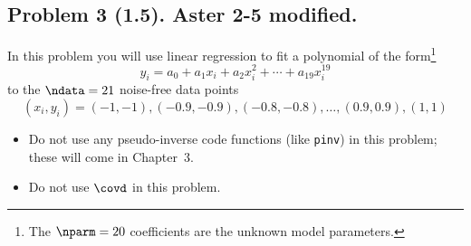 \documentclass[11pt,titlepage,fleqn]{article}
\begin{document}

\subsection*{Problem 3 (1.5). Aster 2-5 modified.}

In this problem you will use linear regression to fit a polynomial of the form\footnote{The $\nparm = 20$ coefficients are the unknown model parameters.}
%
\begin{equation}
y_i = a_0 + a_1x_i + a_2x_i^2 + \cdots + a_{19}x_i^{19}
\label{yi}
\end{equation}
%
to the $\ndata=21$ noise-free data points
%
\begin{equation*}
(x_i,y_i) = (-1,-1), (-0.9,-0.9), (-0.8,-0.8), \ldots, (0.9,0.9), (1,1)
\end{equation*}
%
\begin{itemize}
\item Do not use any pseudo-inverse code functions (like \verb+pinv+) in this problem; these will come in Chapter~3.

\item Do not use $\covd$ in this problem.
\end{itemize}

\end{document}
